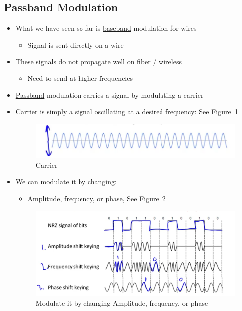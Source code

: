 \documentclass[12pt]{ctexart}   %
\begin{document}
	 \subsection{Passband Modulation}
	 \begin{itemize}
	 	\item What we have seen so far is \underline{baseband} modulation for wires
	 	\begin{itemize}
	 		\item Signal is sent directly on a wire
	 	\end{itemize}
	 	
	 	\item These signals do not propagate well on fiber / wireless
	 	\begin{itemize}
	 		\item Need to send at higher frequencies
	 	\end{itemize}
	 	
	 	\item \underline{Passband} modulation carries a signal by modulating a carrier
	 	
	 	\item Carrier is simply a signal oscillating at a desired frequency: See Figure~\ref{fig:2-4-6}
	 	\begin{figure}[h!] %
		 \centering
		 \includegraphics[scale=0.7]{images/2-4-6}
		\caption{ Carrier}
		 \label{fig:2-4-6}
		 \end{figure}
		 
		 \item We can modulate it by changing:
		 \begin{itemize}
		 	\item Amplitude, frequency, or phase, See Figure~\ref{fig:2-4-7}
		 \end{itemize}
		 
		 \begin{figure}[h!] %
		 \centering
		 \includegraphics[scale=0.7]{images/2-4-7}
		\caption{ Modulate it by changing Amplitude, frequency, or phase}
		 \label{fig:2-4-7}
		 \end{figure}
	 \end{itemize}
	 
\end{document}
